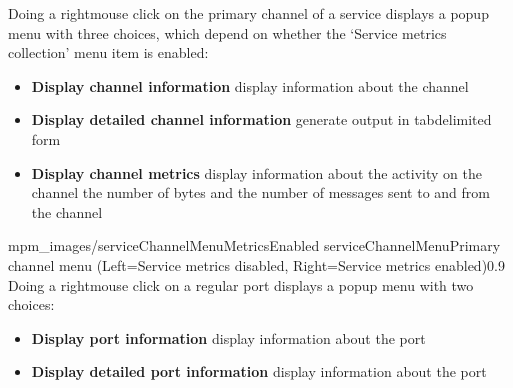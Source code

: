 Doing a right\longDash{}mouse click on the primary channel of a service displays a popup
menu with three choices, which depend on whether the `Service metrics collection' menu
item is enabled:
\begin{itemize}
\item\textbf{Display channel information} display information about the channel
\item\exSp\textbf{Display detailed channel information} generate output in
tab\longDash{}delimited form
\item\exSp\textbf{Display channel metrics} display information about the activity on the
channel \longDash{} the number of bytes and the number of messages sent to and from the
channel
\end{itemize}
%
{mpm_images/serviceChannelMenuMetricsEnabled}%
{serviceChannelMenu}{Primary channel menu (Left=Service metrics disabled, Right=Service
metrics enabled)}{0.9}
\clearpage
Doing a right\longDash{}mouse click on a regular port displays a popup menu with two
choices:
\begin{itemize}
\item\textbf{Display port information} display information about the port
\item\exSp\textbf{Display detailed port information} display information about the port
\end{itemize}

